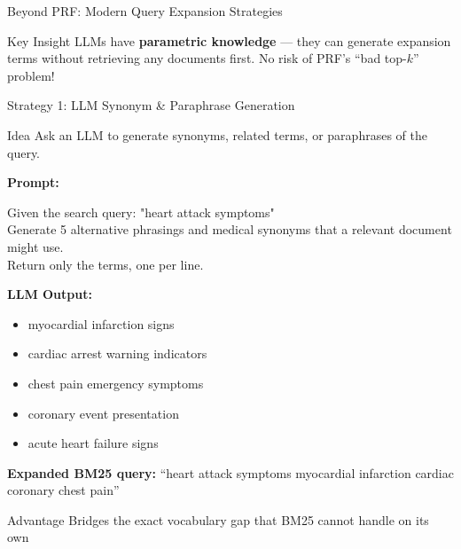 \documentclass[aspectratio=169]{beamer}
\begin{document}

\begin{frame}{Beyond PRF: Modern Query Expansion Strategies}
\begin{center}

\end{center}

\vspace{1em}

\begin{block}{Key Insight}
LLMs have \textbf{parametric knowledge} --- they can generate expansion terms without retrieving any documents first. No risk of PRF's ``bad top-$k$'' problem!
\end{block}
\end{frame}

\begin{frame}[shrink=5]{Strategy 1: LLM Synonym \& Paraphrase Generation}
\begin{block}{Idea}
Ask an LLM to generate synonyms, related terms, or paraphrases of the query.
\end{block}

\vspace{0.5em}

\textbf{Prompt:}
\begin{tcolorbox}[colback=gray!10, colframe=gray!50, fontupper=\small\ttfamily]
Given the search query: "heart attack symptoms"\\
Generate 5 alternative phrasings and medical synonyms that a relevant document might use.\\
Return only the terms, one per line.
\end{tcolorbox}

\vspace{0.5em}

\textbf{LLM Output:}
\begin{itemize}
    \item myocardial infarction signs
    \item cardiac arrest warning indicators
    \item chest pain emergency symptoms
    \item coronary event presentation
    \item acute heart failure signs
\end{itemize}

\vspace{0.5em}

\textbf{Expanded BM25 query:} ``heart attack symptoms myocardial infarction cardiac coronary chest pain''

\begin{exampleblock}{Advantage}
Bridges the exact vocabulary gap that BM25 cannot handle on its own
\end{exampleblock}
\end{frame}
\end{document}
